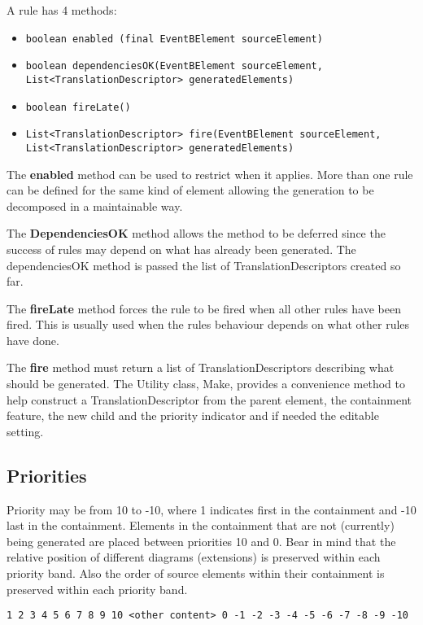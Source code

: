 A rule has 4 methods:
\begin{itemize}
\item \texttt{boolean enabled (final EventBElement sourceElement)}
\item \texttt{boolean dependenciesOK(EventBElement sourceElement, \\  List<TranslationDescriptor> generatedElements)}
\item \texttt{boolean fireLate()}
\item \texttt{List<TranslationDescriptor> fire(EventBElement sourceElement, \\   List<TranslationDescriptor> generatedElements)}
\end{itemize}

The \textbf{enabled} method can be used to restrict when it applies. More than one rule can be defined for the same kind of element allowing the generation to be decomposed in a maintainable way. 

The \textbf{DependenciesOK} method allows the method to be deferred since the success of rules may depend on what has already been generated. The dependenciesOK method is passed the list of TranslationDescriptors created so far.

The \textbf{fireLate} method forces the rule to be fired when all other rules have been fired. This is usually used when the rules behaviour depends on what other rules have done.

The \textbf{fire} method must return a list of TranslationDescriptors describing what should be generated. The Utility class, Make, provides a convenience method to help construct a TranslationDescriptor from the parent element, the containment feature, the new child and the priority indicator and if needed the editable setting.

\subsection{Priorities}
\label{sec:priorities}

Priority may be from 10 to -10, where 1 indicates first in the containment and -10 last in the containment. Elements in the containment that are not (currently) being generated are placed between priorities 10 and 0. Bear in mind that the relative position of different diagrams (extensions) is preserved within each priority band. Also the order of source elements within their containment is preserved within each priority band.

\begin{verbatim}
1 2 3 4 5 6 7 8 9 10 <other content> 0 -1 -2 -3 -4 -5 -6 -7 -8 -9 -10
\end{verbatim}

